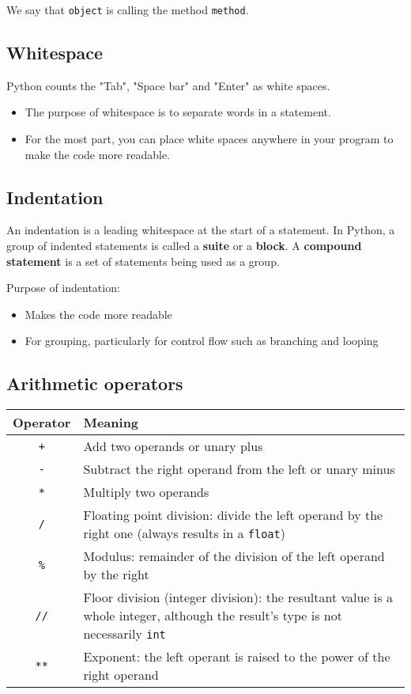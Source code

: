 \documentclass[11pt]{article}
\begin{document}
 \noindent We say that \texttt{object} is calling the method \texttt{method}.
\subsection{Whitespace}
\label{sec:org17a16d8}
Python counts the "Tab", "Space bar" and "Enter" as white spaces.
\begin{itemize}
\item The purpose of whitespace is to separate words in a statement.
\item For the most part, you can place white spaces anywhere in your program to make the code more readable.
\end{itemize}
\subsection{Indentation}
\label{sec:orgf740bda}
An indentation is a leading whitespace at the start of a statement. In Python, a group of indented statements is called a \textbf{suite} or a \textbf{block}. A \textbf{compound statement} is a set of statements being used as a group.

Purpose of indentation:
\begin{itemize}
\item Makes the code more readable
\item For grouping, particularly for control flow such as branching and looping
\end{itemize}
\subsection{Arithmetic operators}
\label{sec:org7b09d42}

\begin{center}
\begin{tabular}{|c|m{32em}|}
\hline
Operator & Meaning\\
\hline
\texttt{+} & Add two operands or unary plus\\
\hline
\texttt{-} & Subtract the right operand from the left or unary minus\\
\hline
\texttt{*} & Multiply two operands\\
\hline
\texttt{/} & Floating point division: divide the left operand by the right one (always results in a \texttt{float})\\
\hline
\texttt{\%} & Modulus: remainder of the division of the left operand by the right\\
\hline
\texttt{//} & Floor division (integer division): the resultant value is a whole integer, although the result's type is not necessarily \texttt{int}\\
\hline
\texttt{**} & Exponent: the left operant is raised to the power of the right operand\\
\hline
\end{tabular}
\end{center}
\end{document}
